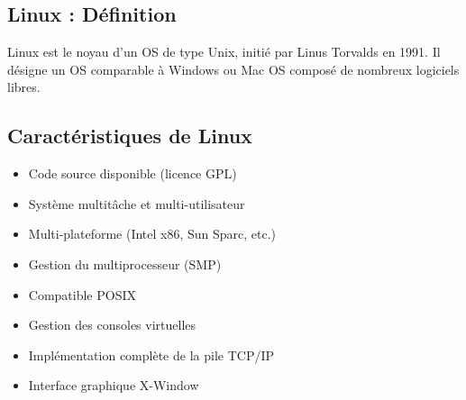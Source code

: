 \documentclass[12pt,a4paper]{article}
\begin{document}

\subsection{Linux : D\'efinition}
Linux est le noyau d'un OS de type Unix, initi\'e par Linus Torvalds en 1991. Il d\'esigne un OS comparable \`a Windows ou Mac OS compos\'e de nombreux logiciels libres.


\subsection{Caract\'eristiques de Linux}
\begin{itemize}
    \item Code source disponible (licence GPL) %
    \item Syst\`eme multit\^ache et multi-utilisateur %
    \item Multi-plateforme (Intel x86, Sun Sparc, etc.) %
    \item Gestion du multiprocesseur (SMP) %
    \item Compatible POSIX %
    \item Gestion des consoles virtuelles %
    \item Impl\'ementation compl\`ete de la pile TCP/IP %
    \item Interface graphique X-Window %
\end{itemize}
\end{document}
